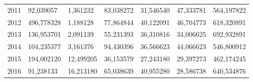 \begin{table}
\begin{tabular}{p{1cm}p{2cm}p{2cm}p{2cm}p{2cm}p{2cm}p{2cm}}
 2011 &                 92,039057 &     1,361232 &            83,038272 &                               31,546540 &              47,333781 &  564,197822 \\
 2012 &                496,778328 &     1,188128 &            77,864844 &                               40,122091 &              46,704773 &  618,320891 \\
 2013 &                136,953701 &     2,091139 &            55,231393 &                               36,310816 &              34,006625 &  692,932891 \\
 2014 &                104,235377 &     3,161376 &            94,430396 &                               36,566623 &              44,066623 &  546,800912 \\
 2015 &                194,002120 &    12,499205 &            36,153579 &                               27,243180 &              29,397273 &  462,174245 \\
 2016 &                 91,238133 &    16,213180 &            65,038639 &                               40,955280 &              28,586738 &  640,534876 \\
\bottomrule
\end{tabular}
\end{table}
